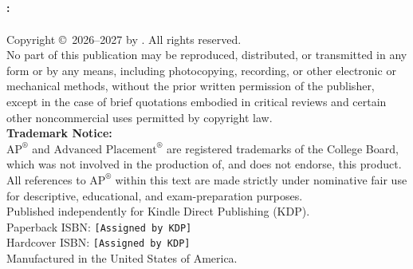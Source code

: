 
\thispagestyle{empty}
\begin{center}
  \vspace*{2cm}
  {\Huge\bfseries\color{MidnightBlue} \BookTitle}\\[12pt]
  {\Large\color{DarkSlateGray} \BookSubtitle}\\[24pt]
  {\large\bfseries \BookSeries}\\[36pt]
  {\Large \BookAuthor}\\[24pt]
  {\normalsize \Edition}
\end{center}
\clearpage

\thispagestyle{empty}
\vspace*{\fill}
\begin{center}
  \begin{minipage}{0.9\linewidth}
    \small
    \textbf{\BookTitle: \BookSubtitle}\\
    \BookSeries\\[6pt]
    Copyright \copyright\ 2026--2027 by \BookAuthor. All rights reserved.\\[10pt]
    No part of this publication may be reproduced, distributed, or transmitted in any form or by any means, including photocopying, recording, or other electronic or mechanical methods, without the prior written permission of the publisher, except in the case of brief quotations embodied in critical reviews and certain other noncommercial uses permitted by copyright law.\\[10pt]
    \textbf{Trademark Notice:}\\
    $\text{AP}^\circledR$ and $\text{Advanced Placement}^\circledR$ are registered trademarks of the College Board, which was not involved in the production of, and does not endorse, this product. All references to $\text{AP}^\circledR$ within this text are made strictly under nominative fair use for descriptive, educational, and exam-preparation purposes.\\[10pt]
    Published independently for Kindle Direct Publishing (KDP).\\
    Paperback ISBN: \texttt{[Assigned by KDP]}\\
    Hardcover ISBN: \texttt{[Assigned by KDP]}\\
    Manufactured in the United States of America.
  \end{minipage}
\end{center}
\vspace*{\fill}
\clearpage

